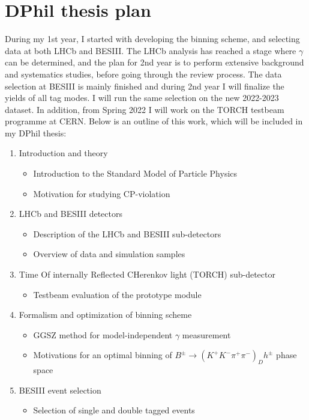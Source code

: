 \documentclass[12pt, a4paper, notitlepage, onecolumn]{article}
\begin{document}
\section*{DPhil thesis plan}
\noindent During my 1st year, I started with developing the binning scheme, and selecting data at both LHCb and BESIII. The LHCb analysis has reached a stage where $\gamma$ can be determined, and the plan for 2nd year is to perform extensive background and systematics studies, before going through the review process. The data selection at BESIII is mainly finished and during 2nd year I will finalize the yields of all tag modes. I will run the same selection on the new 2022-2023 dataset. In addition, from Spring 2022 I will work on the TORCH testbeam programme at CERN. Below is an outline of this work, which will be included in my DPhil thesis:
\begin{enumerate}
  \item{Introduction and theory}
  \begin{itemize}
    \item{Introduction to the Standard Model of Particle Physics}
    \item{Motivation for studying CP-violation}
  \end{itemize}
  \item{LHCb and BESIII detectors}
  \begin{itemize}
    \item{Description of the LHCb and BESIII sub-detectors}
    \item{Overview of data and simulation samples}
  \end{itemize}
  \item{Time Of internally Reflected CHerenkov light (TORCH) sub-detector}
  \begin{itemize}
    \item{Testbeam evaluation of the prototype module}
  \end{itemize}
  \item{Formalism and optimization of binning scheme}
  \begin{itemize}
    \item{GGSZ method for model-independent $\gamma$ measurement}
    \item{Motivations for an optimal binning of $B^\pm\to(K^+K^-\pi^+\pi^-)_Dh^\pm$ phase space}
  \end{itemize}
  \item{BESIII event selection}
  \begin{itemize}
    \item{Selection of single and double tagged events}

\end{itemize}
\end{enumerate}
\end{document}
